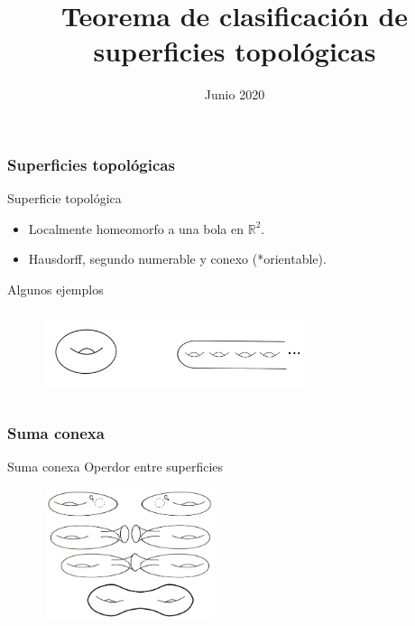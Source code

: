 \documentclass{beamer}
\title[Teorema de clasificación de superficies]{Teorema de clasificación de superficies topológicas}
\author[Rodrigo De Pool]{}
\date[]{Junio 2020}
\begin{document}
\frame{\titlepage}
 
\begin{frame}
\frametitle{Superficies topológicas}

\begin{block}{Superficie topológica}
\begin{itemize}
    \item Localmente homeomorfo a una bola en $\mathbb{R}^2$.
    \item Hausdorff, segundo numerable y conexo (*orientable).
\end{itemize}
\end{block}

Algunos ejemplos
\begin{figure}[htb]
\begin{center}
\includegraphics[width=3in,height=1in]{imagenes/diapo1.png} 
\end{center}
\end{figure}

\end{frame}

\begin{frame}
\frametitle{Suma conexa}
\begin{block}{Suma conexa}
Operdor entre superficies

\end{block}
\begin{figure}[htb]
\begin{center}
\includegraphics[width=2in,height=1.5in]{imagenes/sumaconexa_toros_R3.png} 
\end{center}
\end{figure}

\end{frame}
\end{document}
